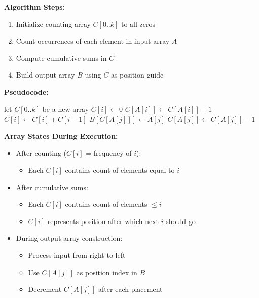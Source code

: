 \textbf{Algorithm Steps:}
\begin{enumerate}[noitemsep]
    \item Initialize counting array $C[0..k]$ to all zeros
    \item Count occurrences of each element in input array $A$
    \item Compute cumulative sums in $C$
    \item Build output array $B$ using $C$ as position guide
\end{enumerate}

\textbf{Pseudocode:}
\begin{algorithmic}[1]
    \State let $C[0..k]$ be a new array
        \State $C[i] \gets 0$
    \EndFor
        \State $C[A[i]] \gets C[A[i]] + 1$
    \EndFor
        \State $C[i] \gets C[i] + C[i-1]$
    \EndFor
        \State $B[C[A[j]]] \gets A[j]$
        \State $C[A[j]] \gets C[A[j]] - 1$
    \EndFor
\EndFunction
\end{algorithmic}

\textbf{Array States During Execution:}
\begin{itemize}[noitemsep]
    \item After counting ($C[i]$ = frequency of $i$):
        \begin{itemize}[noitemsep]
            \item Each $C[i]$ contains count of elements equal to $i$
        \end{itemize}
    \item After cumulative sums:
        \begin{itemize}[noitemsep]
            \item Each $C[i]$ contains count of elements $\leq i$
            \item $C[i]$ represents position after which next $i$ should go
        \end{itemize}
    \item During output array construction:
        \begin{itemize}[noitemsep]
            \item Process input from right to left
            \item Use $C[A[j]]$ as position index in $B$
            \item Decrement $C[A[j]]$ after each placement
        \end{itemize}
\end{itemize}


